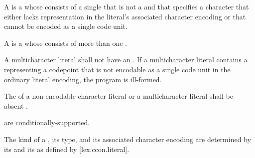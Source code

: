 \documentclass{wg21}
\begin{document}
    \pnum
    \begin{removedblock}
        A 
        is a 
        whose  consists of a single 
        that is not a  and
        that specifies a character
        that either lacks representation in the literal's associated character encoding
        or that cannot be encoded as a single code unit.
    \end{removedblock}
    A  is a 
    whose  consists of
    more than one .
    \begin{addedblock}
        A multicharacter literal shall not have an .
        If a multicharacter literal contains a  representing a codepoint that is not encodable as a single code unit in the ordinary literal encoding, the program is ill-formed.
    \end{addedblock}
    
    \begin{removedblock}
        The  of
        a non-encodable character literal or
        a multicharacter literal
        shall be absent .
    \end{removedblock}
    
     are conditionally-supported.
    
    \pnum
    The kind of a ,
    its type, and its associated character encoding
    are determined by
    its  and its 
    as defined by [lex.ccon.literal].
    
\end{document}
